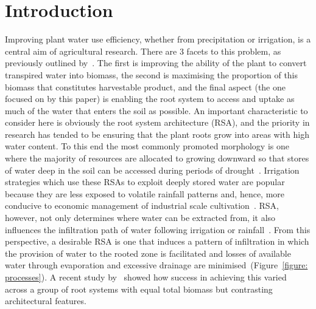 \documentclass[11pt,a4paper]{article}
\numberwithin{equation}{section}
\begin{document}
\section{Introduction}
Improving plant water use efficiency, whether from precipitation or irrigation, is a central aim of agricultural research. There are 3 facets to this problem, as previously outlined by~\citep{condon2004breeding}. The first is improving the ability of the plant to  convert transpired water into biomass, the second is maximising the proportion of this biomass that constitutes harvestable product, and the final aspect (the one focused on by this paper) is enabling the root system to access and uptake as much of the water that enters the soil as possible. An important characteristic to consider here is obviously the root system architecture (RSA), and the priority in research has tended to be ensuring that the plant roots grow into areas with high water content. To this end the most commonly promoted morphology is one where the majority of resources are allocated to growing downward so that stores of water deep in the soil can be accessed during periods of drought~\citep{lynch2013steep, uga2013control, lynch2015opportunities}. Irrigation strategies which use these RSAs to exploit deeply stored water are popular because they are less exposed to volatile rainfall patterns and, hence, more conducive to economic management of industrial scale cultivation~\citep{wasson2012traits}. 
RSA, however, not only determines where water can be extracted from, it also influences the infiltration path of water following irrigation or rainfall~\citep{ghestem2011influence,noguchi1997soil,noguchi1999morphological}. From this perspective, a desirable RSA is one that induces a pattern of infiltration in which the provision of water to the rooted zone is facilitated and losses of available water through evaporation and excessive drainage are minimised~(Figure~\ref{figure: processes}). A recent study by~\cite{mair2023can} showed how success in achieving this varied across a group of root systems with equal total biomass but contrasting architectural features. 
\end{document}
